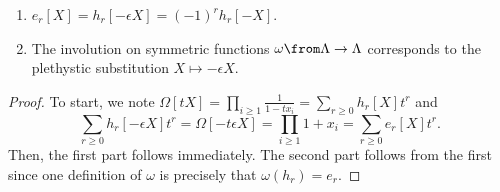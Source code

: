 \documentclass[11pt,leqno,oneside]{amsart}
\numberwithin{thm}{section}
\newcommand{\sym}{\Lambda}
\begin{document}
\begin{cor}
  \begin{enumerate}
  \item \(e_r[X] = h_r[-\epsilon X] = (-1)^r h_r[-X]\).
  \item The involution on symmetric functions \(\omega \from \sym \to
    \sym\) corresponds to the plethystic substitution \(X \mapsto
    -\epsilon X\).
  \end{enumerate}
\end{cor}
\begin{proof}
  To start, we note \(\Omega[tX] = \prod_{i \geq 1} \frac{1}{1-tx_i} =
  \sum_{r 
    \geq 0} h_r[X]t^r\) and \[
\sum_{r
    \geq 0} h_r[-\epsilon X]t^r = \Omega[-t\epsilon X] = \prod_{i \geq
    1} 1+x_i = \sum_{r \geq 0} e_r[X]t^r.
   \]
   Then, the first part follows
   immediately. The second part follows from the first since one
   definition of \(\omega\) is precisely that \(\omega(h_r) = e_r\).
\end{proof}
  
\end{document}
